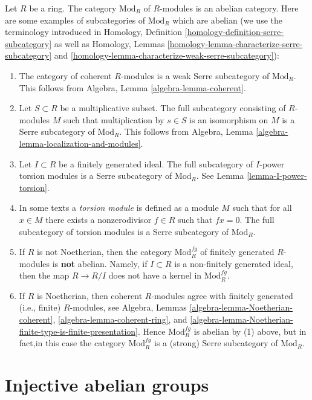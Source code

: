 \noindent
Let $R$ be a ring. The category $\text{Mod}_R$ of $R$-modules is an
abelian category. Here are some examples of subcategories
of $\text{Mod}_R$ which are abelian (we use the terminology introduced in
Homology, Definition \ref{homology-definition-serre-subcategory}
as well as
Homology, Lemmas \ref{homology-lemma-characterize-serre-subcategory} and
\ref{homology-lemma-characterize-weak-serre-subcategory}):
\begin{enumerate}
\item The category of coherent $R$-modules is a weak Serre subcategory
of $\text{Mod}_R$. This follows from
Algebra, Lemma \ref{algebra-lemma-coherent}.
\item Let $S \subset R$ be a multiplicative subset. The full subcategory 
consisting of $R$-modules $M$ such that multiplication by $s \in S$
is an isomorphism on $M$ is a Serre subcategory of $\text{Mod}_R$.
This follows from Algebra, Lemma \ref{algebra-lemma-localization-and-modules}.
\item Let $I \subset R$ be a finitely generated ideal. The full subcategory of
$I$-power torsion modules is a Serre subcategory of $\text{Mod}_R$.
See Lemma \ref{lemma-I-power-torsion}.
\item In some texts a {\it torsion module} is defined as a module $M$
such that for all $x \in M$ there exists a nonzerodivisor $f \in R$
such that $fx = 0$. The full subcategory of torsion modules is a
Serre subcategory of $\text{Mod}_R$.
\item If $R$ is not Noetherian, then the category $\text{Mod}^{fg}_R$
of finitely generated $R$-modules is {\bf not} abelian. Namely,
if $I \subset R$ is a non-finitely generated ideal, then the
map $R \to R/I$ does not have a kernel in $\text{Mod}^{fg}_R$.
\item If $R$ is Noetherian, then coherent $R$-modules agree with
finitely generated (i.e., finite) $R$-modules, see
Algebra, Lemmas \ref{algebra-lemma-Noetherian-coherent},
\ref{algebra-lemma-coherent-ring}, and
\ref{algebra-lemma-Noetherian-finite-type-is-finite-presentation}.
Hence $\text{Mod}^{fg}_R$ is abelian by (1) above, but
in fact,in this case the category $\text{Mod}_R^{fg}$
is a (strong) Serre subcategory of $\text{Mod}_R$.
\end{enumerate}




\section{Injective abelian groups}
\label{section-abelian-groups}

